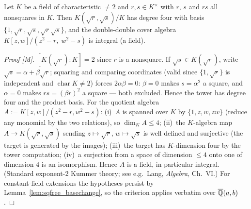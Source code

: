 \begin{lemma}\label{lem:biquad_criterion}
Let $K$ be a field of characteristic $\neq2$ and $r,s\in K^{\times}$ with $r$,
$s$ and $rs$ all nonsquares in $K$.  Then $K(\sqrt r,\sqrt s)/K$ has degree
four with basis $\{1,\sqrt r,\sqrt s,\sqrt r\sqrt s\}$, and the double-double
cover algebra $K[z,w]/(z^{2}-r,\;w^{2}-s)$ is integral (a field).
\end{lemma}
\begin{proof}[Proof {[M]}]
$[K(\sqrt r):K]=2$ since $r$ is a nonsquare.  If $\sqrt s\in K(\sqrt r)$, write
$\sqrt s=\alpha+\beta\sqrt r$; squaring and comparing coordinates (valid since
$\{1,\sqrt r\}$ is independent and $\operatorname{char}K\neq2$) forces
$2\alpha\beta=0$: $\beta=0$ makes $s=\alpha^{2}$ a square, and $\alpha=0$ makes
$rs=(\beta r)^{2}$ a square --- both excluded.  Hence the tower has degree four
and the product basis.  For the quotient algebra $A:=K[z,w]/(z^{2}-r,w^{2}-s)$:
(i)~$A$ is spanned over $K$ by $\{1,z,w,zw\}$ (reduce any monomial by the two
relations), so $\dim_{K}A\le4$; (ii)~the $K$-algebra map $A\to K(\sqrt
r,\sqrt s)$ sending $z\mapsto\sqrt r$, $w\mapsto\sqrt s$ is well defined and
surjective (the target is generated by the images); (iii)~the target has
$K$-dimension four by the tower computation; (iv)~a surjection from a space of
dimension $\le4$ onto one of dimension $4$ is an isomorphism.  Hence $A$ is a
field, in particular integral.
(Standard exponent-2 Kummer theory; see e.g.\ Lang, \emph{Algebra}, Ch.~VI.)
For constant-field extensions the hypotheses persist by
Lemma~\ref{lem:sqfree_basechange}, so the criterion applies verbatim over
$\overline{\mathbb{Q}}(a,b)$.
\end{proof}

